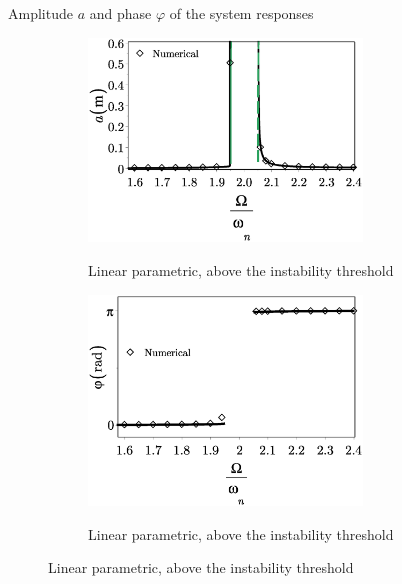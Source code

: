 \documentclass[LaTeX2e,10pt]{beamer}
\begin{document}
\begin{frame}{Amplitude $a$ and phase $\varphi$ of the system responses}
\begin{figure}
\begin{subfigure}[b]{0.45\textwidth}
{\includegraphics[width=0.8\textwidth]{Images/LinearPECase.eps}}
\caption{Linear parametric, above the instability threshold}
\end{subfigure}
\qquad
\begin{subfigure}[b]{0.45\textwidth}
{\includegraphics[width=0.8\textwidth]{Images/CaseBphaseFreq.eps}}
\caption{Linear parametric, above the instability threshold}
\end{subfigure}
\end{figure}
\end{frame}
\end{document}
